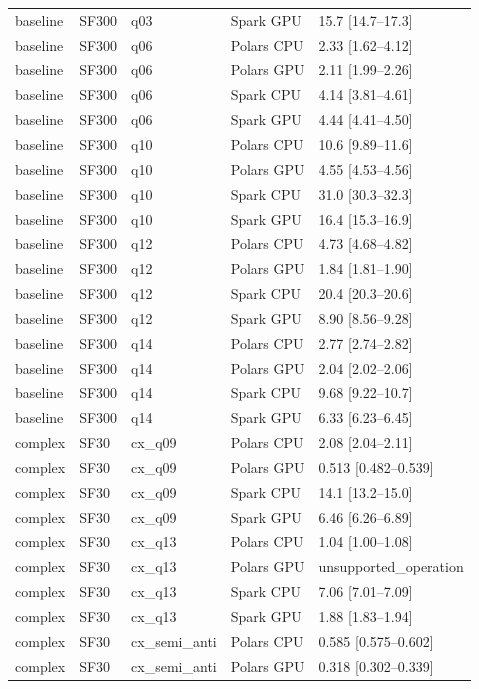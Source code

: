 \begin{longtable}{lllll}
baseline & SF300 & q03 & Spark GPU & 15.7 [14.7--17.3] \\
baseline & SF300 & q06 & Polars CPU & 2.33 [1.62--4.12] \\
baseline & SF300 & q06 & Polars GPU & 2.11 [1.99--2.26] \\
baseline & SF300 & q06 & Spark CPU & 4.14 [3.81--4.61] \\
baseline & SF300 & q06 & Spark GPU & 4.44 [4.41--4.50] \\
baseline & SF300 & q10 & Polars CPU & 10.6 [9.89--11.6] \\
baseline & SF300 & q10 & Polars GPU & 4.55 [4.53--4.56] \\
baseline & SF300 & q10 & Spark CPU & 31.0 [30.3--32.3] \\
baseline & SF300 & q10 & Spark GPU & 16.4 [15.3--16.9] \\
baseline & SF300 & q12 & Polars CPU & 4.73 [4.68--4.82] \\
baseline & SF300 & q12 & Polars GPU & 1.84 [1.81--1.90] \\
baseline & SF300 & q12 & Spark CPU & 20.4 [20.3--20.6] \\
baseline & SF300 & q12 & Spark GPU & 8.90 [8.56--9.28] \\
baseline & SF300 & q14 & Polars CPU & 2.77 [2.74--2.82] \\
baseline & SF300 & q14 & Polars GPU & 2.04 [2.02--2.06] \\
baseline & SF300 & q14 & Spark CPU & 9.68 [9.22--10.7] \\
baseline & SF300 & q14 & Spark GPU & 6.33 [6.23--6.45] \\
complex & SF30 & cx\_q09 & Polars CPU & 2.08 [2.04--2.11] \\
complex & SF30 & cx\_q09 & Polars GPU & 0.513 [0.482--0.539] \\
complex & SF30 & cx\_q09 & Spark CPU & 14.1 [13.2--15.0] \\
complex & SF30 & cx\_q09 & Spark GPU & 6.46 [6.26--6.89] \\
complex & SF30 & cx\_q13 & Polars CPU & 1.04 [1.00--1.08] \\
complex & SF30 & cx\_q13 & Polars GPU & unsupported\_operation \\
complex & SF30 & cx\_q13 & Spark CPU & 7.06 [7.01--7.09] \\
complex & SF30 & cx\_q13 & Spark GPU & 1.88 [1.83--1.94] \\
complex & SF30 & cx\_semi\_anti & Polars CPU & 0.585 [0.575--0.602] \\
complex & SF30 & cx\_semi\_anti & Polars GPU & 0.318 [0.302--0.339] \\

\end{longtable}
